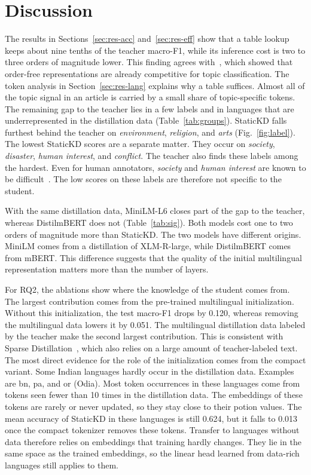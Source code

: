 \documentclass[journal]{IEEEtran}
\begin{document}
\section{Discussion}
\label{sec:discussion}
The results in Sections~\ref{sec:res-acc} and~\ref{sec:res-eff} show that a table lookup keeps about nine tenths of the teacher macro-F1, while its inference cost is two to three orders of magnitude lower. This finding agrees with~\cite{galke2022bow}, which showed that order-free representations are already competitive for topic classification. The token analysis in Section~\ref{sec:res-lang} explains why a table suffices. Almost all of the topic signal in an article is carried by a small share of topic-specific tokens. The remaining gap to the teacher lies in a few labels and in languages that are underrepresented in the distillation data (Table~\ref{tab:groups}). StaticKD falls furthest behind the teacher on \emph{environment}, \emph{religion}, and \emph{arts} (Fig.~\ref{fig:label}). The lowest StaticKD scores are a separate matter. They occur on \emph{society}, \emph{disaster}, \emph{human interest}, and \emph{conflict}. The teacher also finds these labels among the hardest. Even for human annotators, \emph{society} and \emph{human interest} are known to be difficult~\cite{kuzman2025llm}. The low scores on these labels are therefore not specific to the student.

With the same distillation data, MiniLM-L6 closes part of the gap to the teacher, whereas DistilmBERT does not (Table~\ref{tab:sig}). Both models cost one to two orders of magnitude more than StaticKD. The two models have different origins. MiniLM comes from a distillation of XLM-R-large, while DistilmBERT comes from mBERT. This difference suggests that the quality of the initial multilingual representation matters more than the number of layers.

For RQ2, the ablations show where the knowledge of the student comes from. The largest contribution comes from the pre-trained multilingual initialization. Without this initialization, the test macro-F1 drops by 0.120, whereas removing the multilingual data lowers it by 0.051. The multilingual distillation data labeled by the teacher make the second largest contribution. This is consistent with Sparse Distillation~\cite{ye2022sparse}, which also relies on a large amount of teacher-labeled text. The most direct evidence for the role of the initialization comes from the compact variant. Some Indian languages hardly occur in the distillation data. Examples are bn, pa, and or (Odia). Most token occurrences in these languages come from tokens seen fewer than 10 times in the distillation data. The embeddings of these tokens are rarely or never updated, so they stay close to their potion values. The mean accuracy of StaticKD in these languages is still 0.624, but it falls to 0.013 once the compact tokenizer removes these tokens. Transfer to languages without data therefore relies on embeddings that training hardly changes. They lie in the same space as the trained embeddings, so the linear head learned from data-rich languages still applies to them.
\end{document}
